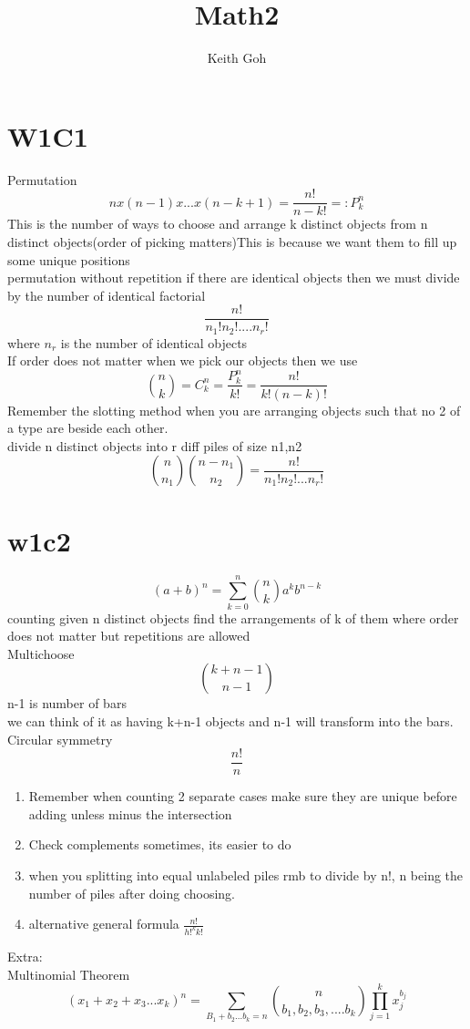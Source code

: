 \documentclass{article}
\title{Math2}
\author{Keith Goh}
\begin{document}
\maketitle

\section{W1C1}
Permutation
$$
nx(n-1)x...x(n-k+1)=\frac{n!}{n-k!}=:P^n_k
$$
This is the number of ways to choose and arrange k distinct objects from n distinct objects(order of picking matters)This is because we want them to fill up some unique positions\\
permutation without repetition if there are identical objects then we must divide by the number of  identical factorial
$$
\frac{n!}{n_1!n_2!....n_r!}
$$
where $n_r$  is the number of identical objects \\
If order does not matter when we pick our objects then we use
$$
{n \choose k} = C^n_k=\frac{P^n_k}{k!}=\frac{n!}{k!(n-k)!}
$$
Remember the slotting method when you are arranging objects such that no 2 of a type are beside each other.\\
divide n distinct objects into r diff piles of size n1,n2
$$
{n \choose n_1}{n-n_1 \choose n_2}=\frac{n!}{n_1!n_2!...n_r!}
$$
\section{w1c2}
$$
(a+b)^n=\sum_{k=0}^n{n \choose k}a^kb^{n-k}
$$
counting given n distinct objects find the arrangements of k of them where order does not matter but repetitions are allowed\\
Multichoose
$$
{k+n-1 \choose n-1}
$$
n-1 is number of bars\\
we can think of it as having k+n-1 objects and n-1 will transform into the bars.\\
Circular symmetry
$$
\frac{n!}{n}
$$
\begin{enumerate}
  \item Remember when counting 2 separate cases make sure they are unique before adding unless minus the intersection
  \item Check complements sometimes, its easier to do
  \item when you splitting into equal unlabeled piles rmb to divide by n!, n being the number of piles after doing choosing.
  \item alternative general formula $\frac{n!}{h!^kk!}$
\end{enumerate}
Extra:\\
Multinomial Theorem
$$
(x_1+x_2+x_3...x_k)^n=\sum_{B_1+b_2...b_k=n}{n \choose b_1,b_2,b_3,....b_k}\prod_{j=1}^kx^{b_j}_j
$$
\end{document}
